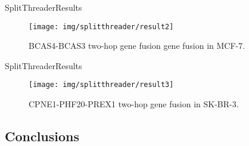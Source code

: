 \documentclass[10pt]{beamer}
\newcommand{\1}{
	\setbeamertemplate{background}{
		\texttt{[image: img/1]}
		\tikz[overlay] \fill[fill opacity=0.75,fill=white] (0,0) rectangle (-\paperwidth,\paperheight);
	}
}
\begin{document}
\begin{frame}{SplitThreader}{Results}	
	\begin{figure}
		\centering
		\texttt{[image: img/splitthreader/result2]}
		\caption{  BCAS4-BCAS3 two-hop gene fusion gene fusion in MCF-7.}
	\end{figure}
\end{frame}

\begin{frame}{SplitThreader}{Results}	
	\begin{figure}
		\centering
		\texttt{[image: img/splitthreader/result3]}
		\caption{  CPNE1-PHF20-PREX1 two-hop gene fusion in SK-BR-3.}
	\end{figure}
\end{frame}

\subsection{Conclusions}
\end{document}
